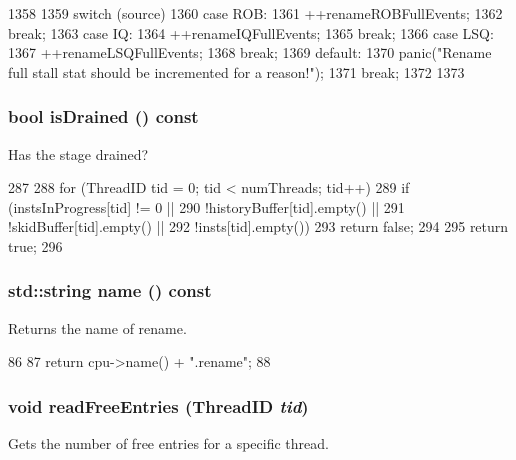 \begin{DoxyCode}
1358 {
1359     switch (source) {
1360       case ROB:
1361         ++renameROBFullEvents;
1362         break;
1363       case IQ:
1364         ++renameIQFullEvents;
1365         break;
1366       case LSQ:
1367         ++renameLSQFullEvents;
1368         break;
1369       default:
1370         panic("Rename full stall stat should be incremented for a reason!");
1371         break;
1372     }
1373 }
\end{DoxyCode}
\hypertarget{classDefaultRename_adf5473c18a3d7c1e88c4a2072bce5526}{
\subsubsection[{isDrained}]{\setlength{\rightskip}{0pt plus 5cm}bool isDrained () const}}
\label{classDefaultRename_adf5473c18a3d7c1e88c4a2072bce5526}
Has the stage drained? 


\begin{DoxyCode}
287 {
288     for (ThreadID tid = 0; tid < numThreads; tid++) {
289         if (instsInProgress[tid] != 0 ||
290             !historyBuffer[tid].empty() ||
291             !skidBuffer[tid].empty() ||
292             !insts[tid].empty())
293             return false;
294     }
295     return true;
296 }
\end{DoxyCode}
\hypertarget{classDefaultRename_a37627d5d5bba7f4a8690c71c2ab3cb07}{
\subsubsection[{name}]{\setlength{\rightskip}{0pt plus 5cm}std::string name () const}}
\label{classDefaultRename_a37627d5d5bba7f4a8690c71c2ab3cb07}
Returns the name of rename. 


\begin{DoxyCode}
86 {
87     return cpu->name() + ".rename";
88 }
\end{DoxyCode}
\hypertarget{classDefaultRename_a7dc4c8fb34921e56b869bac55a7f3806}{
\subsubsection[{readFreeEntries}]{\setlength{\rightskip}{0pt plus 5cm}void readFreeEntries ({\bf ThreadID} {\em tid})}}
\label{classDefaultRename_a7dc4c8fb34921e56b869bac55a7f3806}
Gets the number of free entries for a specific thread. 


